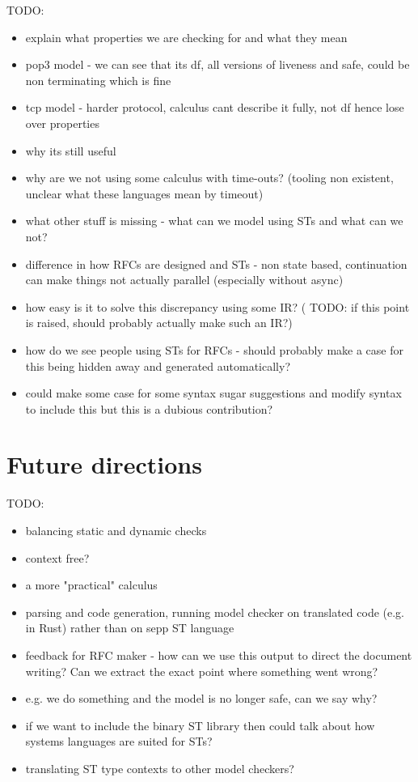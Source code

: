\documentclass{article}
\newcommand{\todo}[1]{}
\renewcommand{\todo}[1]{{\color{red} TODO: {#1}}}
\begin{document}
\todo{
    \begin{itemize}
        \item explain what properties we are checking for and what they mean
        \item pop3 model - we can see that its df, all versions of liveness and safe, could be non terminating which is fine
        \item tcp model - harder protocol, calculus cant describe it fully, not df hence lose over properties
        \item why its still useful
        \item why are we not using some calculus with time-outs? (tooling non existent, unclear what these languages mean by timeout)
        \item what other stuff is missing - what can we model using STs and what can we not?
        \item difference in how RFCs are designed and STs - non state based, continuation can make things not actually parallel (especially without async)
        \item how easy is it to solve this discrepancy using some IR? (\todo{if this point is raised, should probably actually make such an IR?})
        \item how do we see people using STs for RFCs - should probably make a case for this being hidden away and generated automatically?
        \item could make some case for some syntax sugar suggestions and modify syntax to include this but this is a dubious contribution?
    \end{itemize}
}

\section{Future directions}

\todo{
    \begin{itemize}
        \item balancing static and dynamic checks
        \item context free?
        \item a more "practical" calculus
        \item parsing and code generation, running model checker on translated code (e.g. in Rust) rather than on sepp ST language
        \item feedback for RFC maker - how can we use this output to direct the document writing? Can we extract the exact point where something went wrong?
        \item e.g. we do something and the model is no longer safe, can we say why?
        \item if we want to include the binary ST library then could talk about how systems languages are suited for STs?
        \item translating ST type contexts to other model checkers?
    \end{itemize}
}

\medskip
\nocite{*}
\printbibliography
\end{document}
